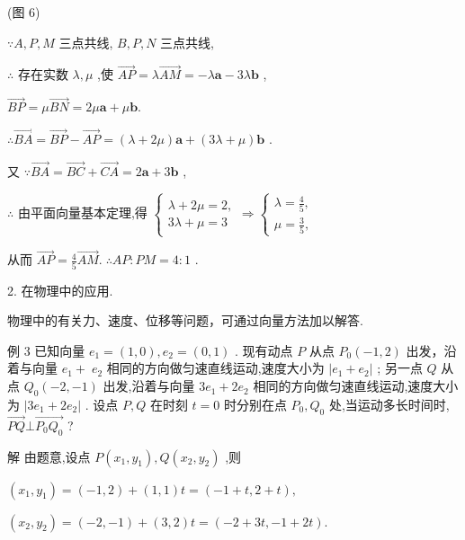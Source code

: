 \documentclass[10pt]{article}
\begin{document}
(图 6)

\(\because A,P,M\) 三点共线, \(B,P,N\) 三点共线,

\(\therefore\) 存在实数 \(\lambda ,\mu\) ,使 \(\overrightarrow{AP} = \lambda \overrightarrow{AM} =  - \lambda \mathbf{a} - {3\lambda }\mathbf{b}\) ,

\(\overrightarrow{BP} = \mu \overrightarrow{BN} = {2\mu }\mathbf{a} + \mu \mathbf{b}.\)

\(\therefore \overrightarrow{BA} = \overrightarrow{BP} - \overrightarrow{AP} = \left( {\lambda  + {2\mu }}\right) \mathbf{a} + \left( {{3\lambda } + \mu }\right) \mathbf{b}\) .

又 \(\because \overrightarrow{BA} = \overrightarrow{BC} + \overrightarrow{CA} = 2\mathbf{a} + 3\mathbf{b}\) ,

\(\therefore\) 由平面向量基本定理,得 \(\left\{  {\begin{array}{l} \lambda  + {2\mu } = 2, \\  {3\lambda } + \mu  = 3 \end{array} \Rightarrow  \left\{  \begin{array}{l} \lambda  = \frac{4}{5}, \\  \mu  = \frac{3}{5}, \end{array}\right. }\right.\)

从而 \(\overrightarrow{AP} = \frac{4}{5}\overrightarrow{AM}.\;\therefore {AP} : {PM} = 4 : 1\) .

2. 在物理中的应用.

物理中的有关力、速度、位移等问题，可通过向量方法加以解答.

例 3 已知向量 \({e}_{1} = \left( {1,0}\right) ,{e}_{2} = \left( {0,1}\right)\) . 现有动点 \(P\) 从点 \({P}_{0}\left( {-1,2}\right)\) 出发，沿着与向量 \({e}_{1} + \; {e}_{2}\) 相同的方向做匀速直线运动,速度大小为 \(\left| {{e}_{1} + {e}_{2}}\right|\) ; 另一点 \(Q\) 从点 \({Q}_{0}\left( {-2, - 1}\right)\) 出发,沿着与向量 \(3{e}_{1} + 2{e}_{2}\) 相同的方向做匀速直线运动,速度大小为 \(\left| {3{e}_{1} + 2{e}_{2}}\right|\) . 设点 \(P,Q\) 在时刻 \(t = 0\) 时分别在点 \({P}_{0},{Q}_{0}\) 处,当运动多长时间时, \(\overrightarrow{PQ} \bot  \overrightarrow{{P}_{0}{Q}_{0}}\) ?

解 由题意,设点 \(P\left( {{x}_{1},{y}_{1}}\right) ,Q\left( {{x}_{2},{y}_{2}}\right)\) ,则

\(\left( {{x}_{1},{y}_{1}}\right)  = \left( {-1,2}\right)  + \left( {1,1}\right) t = \left( {-1 + t,2 + t}\right) ,\)

\(\left( {{x}_{2},{y}_{2}}\right)  = \left( {-2, - 1}\right)  + \left( {3,2}\right) t = \left( {-2 + {3t}, - 1 + {2t}}\right) .\)
\end{document}
